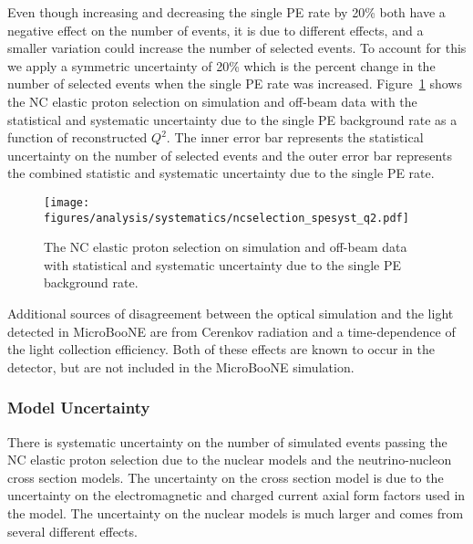     Even though increasing and decreasing the single PE rate by 20\% both have
    a negative effect on the number of events, it is due to different effects,
    and a smaller variation could increase the number of selected events. To
    account for this we apply a symmetric uncertainty of 20\% which is the
    percent change in the number of selected events when the single PE rate was
    increased. Figure~\ref{fig:systspe} shows the NC elastic proton selection
    on simulation and off-beam data with the statistical and systematic
    uncertainty due to the single PE background rate as a function of
    reconstructed $Q^2$. The inner error bar represents the statistical
    uncertainty on the number of selected events and the outer error bar
    represents the combined statistic and systematic uncertainty due to the
    single PE rate.
    \begin{figure}[ht]
      \centering
      \texttt{[image: figures/analysis/systematics/ncselection\_spesyst\_q2.pdf]}
      \caption{The NC elastic proton selection on simulation and off-beam data
      with statistical and systematic uncertainty due to the single PE
      background rate.}
      \label{fig:systspe}
    \end{figure}
    Additional sources of disagreement between the optical simulation and the
    light detected in MicroBooNE are from Cerenkov radiation and a
    time-dependence of the light collection efficiency. Both of these effects
    are known to occur in the detector, but are not included in the MicroBooNE
    simulation.

  \subsubsection{Model Uncertainty}\label{sec:modeluncertainty}
    There is systematic uncertainty on the number of simulated events passing
    the NC elastic proton selection due to the nuclear models and the
    neutrino-nucleon cross section models. The uncertainty on the cross section
    model is due to the uncertainty on the electromagnetic and charged current
    axial form factors used in the model. The uncertainty on the nuclear models
    is much larger and comes from several different effects.

